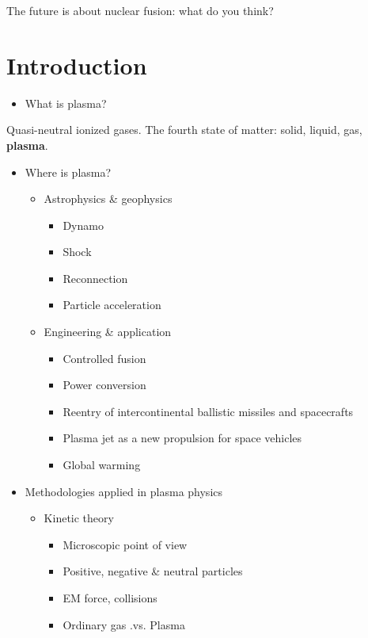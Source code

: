 \documentclass[
  notoc %
]{tufte-book}
\providecommand{\tightlist}{%
  \setlength{\itemsep}{0pt}\setlength{\parskip}{0pt}
}
\begin{document}
The future is about nuclear fusion: what do you think?

\hypertarget{sec:intro}{%
\chapter{Introduction}\label{sec:intro}}

\begin{itemize}
\tightlist
\item
  What is plasma?
\end{itemize}

Quasi-neutral ionized gases. The fourth state of matter: solid, liquid,
gas, \textbf{plasma}.

\begin{itemize}
\tightlist
\item
  Where is plasma?

  \begin{itemize}
  \tightlist
  \item
    Astrophysics \& geophysics

    \begin{itemize}
    \tightlist
    \item
      Dynamo
    \item
      Shock
    \item
      Reconnection
    \item
      Particle acceleration
    \end{itemize}
  \item
    Engineering \& application

    \begin{itemize}
    \tightlist
    \item
      Controlled fusion
    \item
      Power conversion
    \item
      Reentry of intercontinental ballistic missiles and spacecrafts
    \item
      Plasma jet as a new propulsion for space vehicles
    \item
      Global warming
    \end{itemize}
  \end{itemize}
\item
  Methodologies applied in plasma physics

  \begin{itemize}
  \tightlist
  \item
    Kinetic theory

    \begin{itemize}
    \tightlist
    \item
      Microscopic point of view
    \item
      Positive, negative \& neutral particles
    \item
      EM force, collisions
    \item
      Ordinary gas .vs. Plasma


\end{itemize}
\end{itemize}
\end{itemize}
\end{document}
